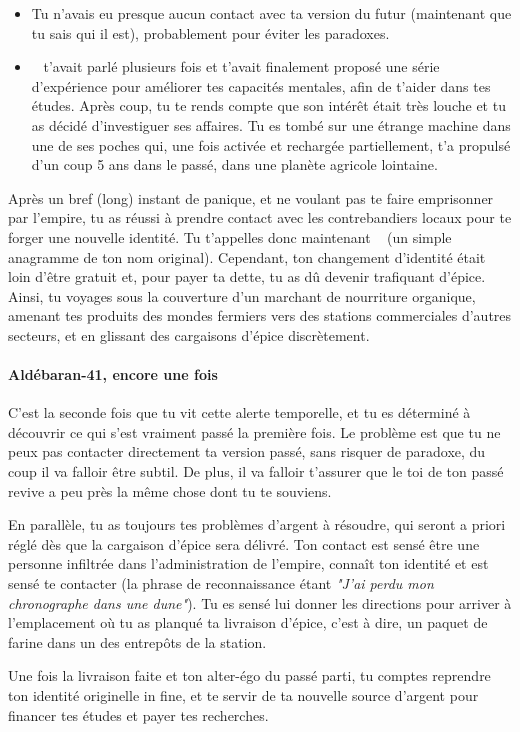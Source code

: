 {\begin{itemize}
		\item Tu n'avais eu presque aucun contact avec ta version du futur (maintenant que tu sais qui il est), probablement pour éviter les paradoxes.
		
		\item \nmPlayerI ~ t'avait parlé plusieurs fois et t'avait finalement proposé une série d'expérience pour améliorer tes capacités mentales, afin de t'aider dans tes études. Après coup, tu te rends compte que son intérêt était très louche et tu as décidé d'investiguer ses affaires. Tu es tombé sur une étrange machine dans une de ses poches qui, une fois activée et rechargée partiellement, t'a propulsé d'un coup 5 ans dans le passé, dans une planète agricole lointaine.
	\end{itemize}
	
	\par Après un bref (long) instant de panique, et ne voulant pas te faire emprisonner par l'empire, tu as réussi à prendre contact avec les contrebandiers locaux pour te forger une nouvelle identité. Tu t'appelles donc maintenant \nmPlayerII ~ (un simple anagramme de ton nom original). Cependant, ton changement d'identité était loin d'être gratuit et, pour payer ta dette, tu as dû devenir trafiquant d'épice. Ainsi, tu voyages sous la couverture d'un marchant de nourriture organique, amenant tes produits des mondes fermiers vers des stations commerciales d'autres secteurs, et en glissant des cargaisons d'épice discrètement.
	
	
	\paragraph{Aldébaran-41, encore une fois} C'est la seconde fois que tu vit cette alerte temporelle, et tu es déterminé à découvrir ce qui s'est vraiment passé la première fois. Le problème est que tu ne peux pas contacter directement ta version passé, sans risquer de paradoxe, du coup il va falloir être subtil. De plus, il va falloir t'assurer que le toi de ton passé revive a peu près la même chose dont tu te souviens.
	
	\par En parallèle, tu as toujours tes problèmes d'argent à résoudre, qui seront a priori réglé dès que la cargaison d'épice sera délivré. Ton contact est sensé être une personne infiltrée dans l'administration de l'empire, connaît ton identité et est sensé te contacter (la phrase de reconnaissance étant \emph{"J'ai perdu mon chronographe dans une dune"}). Tu es sensé lui donner les directions pour arriver à l'emplacement où tu as planqué ta livraison d'épice, c'est à dire, un paquet de farine dans un des entrepôts de la station.
	
	\par Une fois la livraison faite et ton alter-égo du passé parti, tu comptes reprendre ton identité originelle in fine, et te servir de ta nouvelle source d'argent pour financer tes études et payer tes recherches.
}



